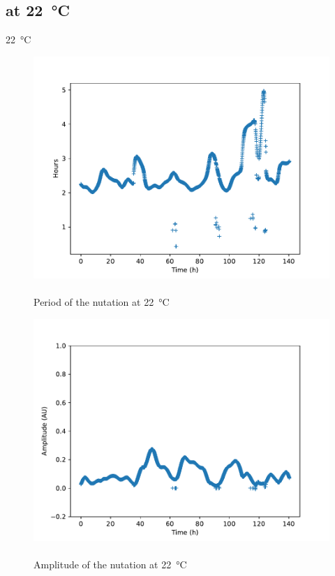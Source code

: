 \documentclass[12pt]{beamer}
\begin{document}
\subsection{at \SI{22}{\celsius}}
\begin{frame}{\SI{22}{\celsius}}

\begin{multicols}{2}
\begin{figure}
\includegraphics[width = \linewidth]{period22.pdf}~\\
Period of the nutation at \SI{22}{\celsius}
\end{figure}
\begin{figure}
\includegraphics[width = \linewidth]{ampl22.pdf}~\\
Amplitude of the nutation at \SI{22}{\celsius}
\end{figure}
\end{multicols}

\end{frame}
\end{document}
